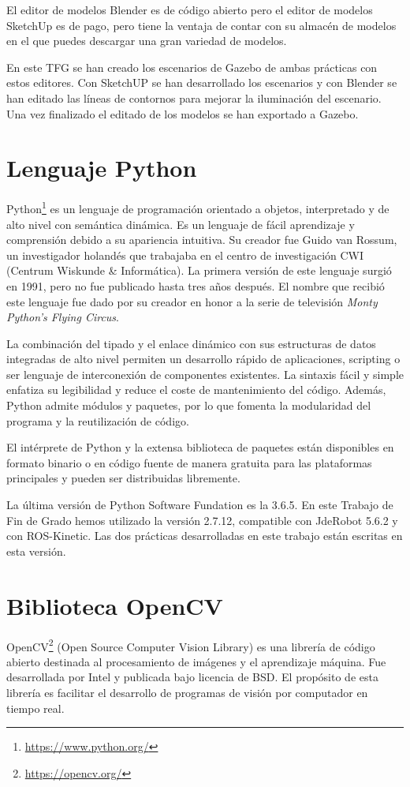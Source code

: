 El editor de modelos Blender es de código abierto pero el editor de modelos SketchUp es de pago, pero tiene la ventaja de contar con su almacén de modelos en el que puedes descargar una gran variedad de modelos.

En este TFG se han creado los escenarios de Gazebo de ambas prácticas con estos editores. Con SketchUP se han desarrollado los escenarios y con Blender se han editado las líneas de contornos para mejorar la iluminación del escenario. Una vez finalizado el editado de los modelos se han exportado a Gazebo.

\section{Lenguaje Python}
Python\footnote{\url{https://www.python.org/}} es un lenguaje de programación orientado a objetos, interpretado y de alto nivel con semántica dinámica. Es un lenguaje de fácil aprendizaje y comprensión debido a su apariencia intuitiva. Su creador fue Guido van Rossum, un investigador holandés que trabajaba en el centro de investigación CWI (Centrum Wiskunde \& Informática). La primera versión de este lenguaje surgió en 1991, pero no fue publicado hasta tres años después. El nombre que recibió este lenguaje fue dado por su creador en honor a la serie de televisión \textit{Monty Python's Flying Circus}.

La combinación del tipado y el enlace dinámico con sus estructuras de datos integradas de alto nivel permiten un desarrollo rápido de aplicaciones, scripting o ser lenguaje de interconexión de componentes existentes. La sintaxis fácil y simple enfatiza su legibilidad y reduce el coste de mantenimiento del código. Además, Python admite módulos y paquetes, por lo que fomenta la modularidad del programa y la reutilización de código.

El intérprete de Python y la extensa biblioteca de paquetes están disponibles en formato binario o en código fuente de manera gratuita para las plataformas principales y pueden ser distribuidas libremente.

La última versión de Python Software Fundation es la 3.6.5. En este Trabajo de Fin de Grado hemos utilizado la versión 2.7.12, compatible con JdeRobot 5.6.2 y con ROS-Kinetic. Las dos prácticas desarrolladas en este trabajo están escritas en esta versión.

\section{Biblioteca OpenCV}
OpenCV\footnote{\url{https://opencv.org/}} (Open Source Computer Vision Library) es una librería de código abierto destinada al procesamiento de imágenes y el aprendizaje máquina. Fue desarrollada por Intel y publicada bajo licencia de BSD. El propósito de esta librería es facilitar el desarrollo de programas de visión por computador en tiempo real.

